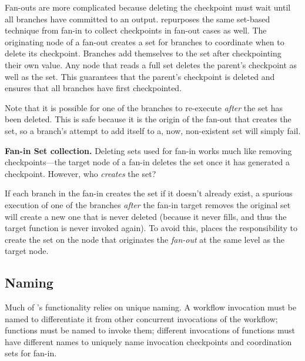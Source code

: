 Fan-outs are more complicated because deleting the checkpoint must wait until
all branches have committed to an output. \name{} repurposes the same
set-based technique from fan-in to collect checkpoints in fan-out cases as
well. The originating node of a fan-out creates a set for branches to
coordinate when to delete its checkpoint. Branches add themselves to the set
after checkpointing their own value. Any node that reads a full set deletes
the parent's checkpoint as well as the set. This guarantees that the parent's
checkpoint is deleted and ensures that all branches have first checkpointed.

Note that it is possible for one of the branches to re-execute \emph{after}
the set has been deleted. This is safe because it is the origin of the fan-out
that creates the set, so a branch's attempt to add itself to a, now,
non-existent set will simply fail.



\textbf{Fan-in Set collection.} Deleting sets used for fan-in works much like
removing checkpoints---the target node of a fan-in deletes the set once it has
generated a checkpoint. However, who \emph{creates} the set?

If each branch in the fan-in creates the set if it doesn't already exist, a
spurious execution of one of the branches \emph{after} the fan-in target
removes the original set will create a new one that is never deleted (because
it never fills, and thus the target function is never invoked again). To avoid
this, \name{} places the responsibility to create the set on the node that
originates the \emph{fan-out} at the same level as the target node.

\subsection{Naming}\label{sec:design:naming}

Much of \name{}'s functionality relies on unique naming. A workflow invocation
must be named to differentiate it from other concurrent invocations of the
workflow; functions must be named to invoke them; different invocations of
functions must have different names to uniquely name invocation checkpoints
and coordination sets for fan-in.

